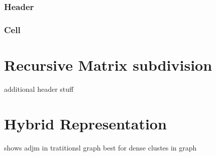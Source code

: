\subsubsection{Header}
\subsubsection{Cell}





\section{Recursive Matrix subdivision}

additional header stuff





\section{Hybrid Representation}

shows adjm in tratitionsl graph
best for dense clustes in graph

